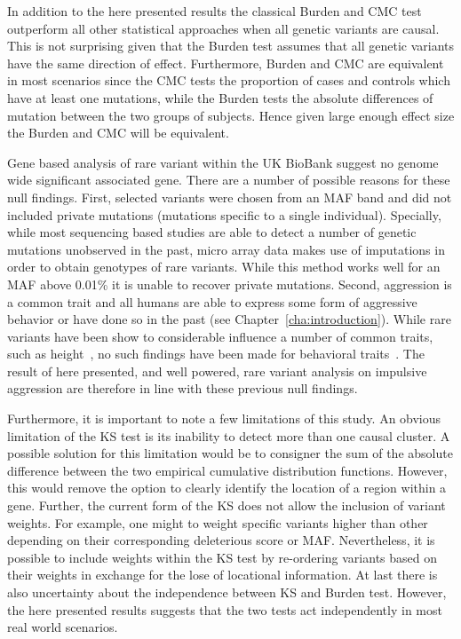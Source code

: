 In addition to the here presented results the classical Burden and CMC test outperform all other statistical approaches when all genetic variants are causal.
This is not surprising given that the Burden test assumes that all genetic variants have the same direction of effect.
Furthermore, Burden and CMC are equivalent in most scenarios since the CMC tests the proportion of cases and controls which have at least one mutations, while the Burden tests the absolute differences of mutation between the two groups of subjects.
Hence given large enough effect size the Burden and CMC will be equivalent.

Gene based analysis of rare variant within the UK BioBank suggest no genome wide significant associated gene.
There are a number of possible reasons for these null findings.
First, selected variants were chosen from an MAF band and did not included private mutations (mutations specific to a single individual).
Specially, while most sequencing based studies are able to detect a number of genetic mutations unobserved in the past, micro array data makes use of imputations in order to obtain genotypes of rare variants.
While this method works well for an MAF above 0.01\% it is unable to recover private mutations.
Second, aggression is a common trait and all humans are able to express some form of aggressive behavior or have done so in the past (see Chapter~\ref{cha:introduction}).
While rare variants have been show to considerable influence a number of common traits, such as height~\cite{Marouli2017}, no such findings have been made for behavioral traits~\cite{Chabris2015}.
The result of here presented, and well powered, rare variant analysis on impulsive aggression are therefore in line with these previous null findings.

Furthermore, it is important to note a few limitations of this study.
An obvious limitation of the KS test is its inability to detect more than one causal cluster.
A possible solution for this limitation would be to consigner the sum of the absolute difference between the two empirical cumulative distribution functions. 
However, this would remove the option to clearly identify the location of a region within a gene. 
Further, the current form of the KS does not allow the inclusion of variant weights.
For example, one might to weight specific variants higher than other depending  on their corresponding deleterious score or MAF\@.
Nevertheless, it is possible to include weights within the KS test by re-ordering variants based on their weights in exchange for the lose of locational information.
At last there is also uncertainty about the independence between KS and Burden test.
However, the here presented results suggests that the two tests act independently in most real world scenarios.  

